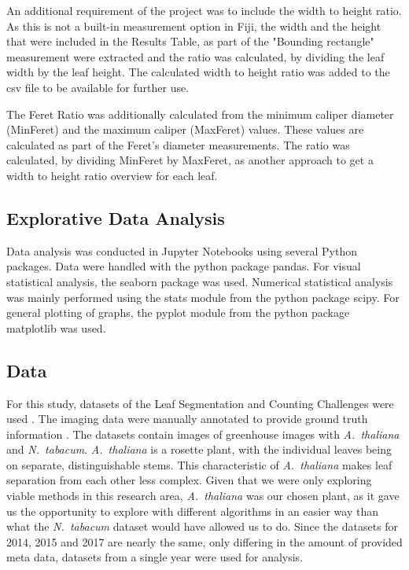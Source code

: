 \documentclass[paper=A4,bibliography=totocnumbered]{scrartcl}
\begin{document}
An additional requirement of the project was to include the width to height ratio. As this is not a built-in measurement option in Fiji, the width and the height that were included in the Results Table, as part of the "Bounding rectangle" measurement were extracted and the ratio was calculated, by dividing the leaf width by the leaf height. The calculated width to height ratio was added to the csv file to be available for further use.

The Feret Ratio was additionally calculated from the minimum caliper diameter (MinFeret) and the maximum caliper (MaxFeret) values. These values are calculated as part of the Feret's diameter measurements. The ratio was calculated, by dividing MinFeret by MaxFeret, as another approach to get a width to height ratio overview for each leaf.



\subsection{Explorative Data Analysis}
Data analysis was conducted in Jupyter Notebooks using several Python packages. Data were handled with the python package pandas. For visual statistical analysis, the seaborn package was used. Numerical statistical analysis was mainly performed using the stats module from the python package scipy. For general plotting of graphs, the pyplot module from the python package matplotlib was used.

\subsection{Data}
For this study, datasets of the Leaf Segmentation and Counting Challenges were used \citep{Minervini.2016}. The imaging data were manually annotated to provide ground truth information \citep{Scharr.2014}. The datasets contain images of greenhouse images with \textit{A.~thaliana} and \textit{N.~tabacum}. \textit{A.~thaliana} is a rosette plant, with the individual leaves being on separate, distinguishable stems. This characteristic of \textit{A.~thaliana} makes leaf separation from each other less complex.  Given that we were only exploring viable methods in this research area, \textit{A.~thaliana} was our chosen plant, as it gave us the opportunity to explore with different algorithms in an easier way than what the \textit{N.~tabacum} dataset would have allowed us to do. Since the datasets for 2014, 2015 and 2017 are nearly the same, only differing in the amount of provided meta data, datasets from a single year were used for analysis. 
\end{document}
